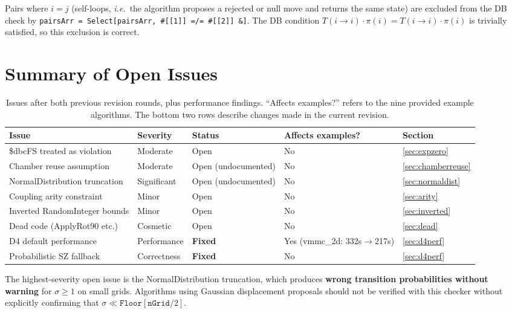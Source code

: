 \documentclass[12pt,a4paper]{article}
\theoremstyle{critical}
\theoremstyle{remark}
\theoremstyle{verified}
\begin{document}
Pairs where $i = j$ (self-loops, \emph{i.e.}\ the algorithm proposes a rejected
or null move and returns the same state) are excluded from the DB check by
\texttt{pairsArr = Select[pairsArr, \#[[1]] =/= \#[[2]] \&]}.  The DB condition
$T(i\to i) \cdot \pi(i) = T(i\to i) \cdot \pi(i)$ is trivially satisfied, so
this exclusion is correct.

\section{Summary of Open Issues}
\label{sec:summary}

\begin{table}[h!]
\centering
\begin{tabular}{lllll}
\toprule
\textbf{Issue} & \textbf{Severity} & \textbf{Status} & \textbf{Affects examples?} & \textbf{Section} \\
\midrule
\$dbcFS treated as violation & Moderate & Open & No & \ref{sec:expzero} \\
Chamber reuse assumption & Moderate & Open (undocumented) & No & \ref{sec:chamberreuse} \\
NormalDistribution truncation & Significant & Open (undocumented) & No & \ref{sec:normaldist} \\
Coupling arity constraint & Minor & Open & No & \ref{sec:arity} \\
Inverted RandomInteger bounds & Minor & Open & No & \ref{sec:inverted} \\
Dead code (ApplyRot90 etc.) & Cosmetic & Open & No & \ref{sec:dead} \\
D4 default performance & Performance & \textbf{Fixed} & Yes (vmmc\_2d: 332s$\to$217s) & \ref{sec:d4perf} \\
Probabilistic SZ fallback & Correctness & \textbf{Fixed} & No & \ref{sec:d4perf} \\
\bottomrule
\end{tabular}
\caption{Issues after both previous revision rounds, plus performance findings.
  ``Affects examples?'' refers to the nine provided example algorithms.
  The bottom two rows describe changes made in the current revision.}
\end{table}

The highest-severity open issue is the NormalDistribution truncation, which
produces \textbf{wrong transition probabilities without warning} for
$\sigma \geq 1$ on small grids.  Algorithms using Gaussian displacement proposals
should not be verified with this checker without explicitly confirming that $\sigma
\ll \texttt{Floor}[\texttt{nGrid}/2]$.
\end{document}
